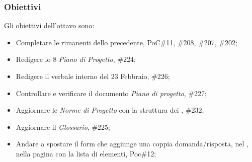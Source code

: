 \subsubsection{Obiettivi}
\label{sec:sprint8_obiettivi}
Gli obiettivi dell'ottavo  sono:
\begin{itemize}
    \item Completare le  rimanenti dello  precedente,  PoC\#11, \#208, \#207, \#202;
    \item Redigere lo  8 \textit{Piano di Progetto},  \#224;
    \item Redigere il verbale interno del 23 Febbraio,  \#226;
    \item Controllare e verificare il documento \textit{Piano di progetto},  \#227;
        \item Aggiornare le \textit{Norme di Progetto} con la struttura dei ,  \#232;
    \item Aggiornare il \textit{Glossario},  \#225;
    \item Andare a spostare il form che aggiunge una coppia domanda/risposta, nel , nella pagina con la lista di elementi,  Poc\#12;
\end{itemize}